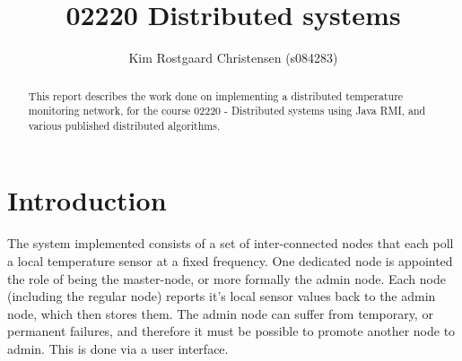\documentclass[10pt,a4paper]{article}
\begin{document}
\def\File#1{\textsf{#1}}
\def\Code#1{\texttt{#1}}
\def\Key#1{\textsf{#1}}

\title{02220 Distributed systems}
\author{Kim Rostgaard Christensen (s084283)}

\maketitle

\tableofcontents

\begin{abstract}
This report describes the work done on implementing a distributed temperature monitoring network, for the course 02220 - Distributed systems using Java RMI, and various published distributed algorithms.
\end{abstract}

\section{Introduction}
The system implemented consists of a set of inter-connected nodes that each poll a local temperature sensor at a fixed frequency. One dedicated node is appointed the role of being the master-node, or more formally the admin node. Each node (including the regular node) reports it's local sensor values back to the admin node, which then stores them.
The admin node can suffer from temporary, or permanent failures, and therefore it must be possible to promote another node to admin. This is done via a user interface.



\end{document}
